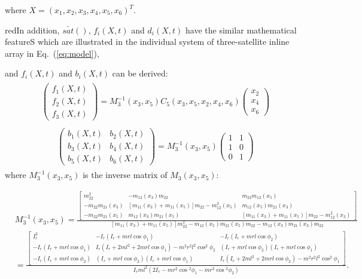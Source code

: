 where $X = (x_1,x_2,x_3,x_4,x_5,x_6)^T$. \begin{color}{red}In addition, $\bar{sat}()$, $f_i(X,t)$ and $d_i(X,t)$ have the similar mathematical featureS which are illustrated in the individual system of three-satellite inline array in Eq.~(\ref{eq:model}),\end{color} and $f_i(X,t)$ and $b_i(X,t)$ can be derived:
\begin{align}
\begin{split}
\begin{pmatrix}
f_1(X,t)\\
f_2(X,t)\\
f_3(X,t)
\end{pmatrix}=
M_3^{-1}(x_3,x_5)C_5(x_3,x_5,x_2,x_4,x_6)
\begin{pmatrix}
x_2\\
x_4\\
x_6
\end{pmatrix}
\end{split}
\end{align}
\begin{align}
\begin{split}
\begin{pmatrix}
b_1(X,t)&b_2(X,t)\\
b_3(X,t)&b_4(X,t)\\
b_5(X,t)&b_6(X,t)
\end{pmatrix}=
M_3^{-1}(x_3,x_5)
\begin{pmatrix}
1 &1\\
1 &0\\
0 &1
\end{pmatrix}
\end{split}
\end{align}
where $M_3^{-1}(x_3,x_5)$ is the inverse matrix of $M_3(x_3,x_5)$:
\begin{footnotesize}
\begin{align*}
&M_3^{-1}(x_3,x_5)
=\frac{\begin{bmatrix}
m_{22}^2 &-m_{12}(x_3)m_{22} &m_{22}m_{12}(x_5)\\
-m_{22}m_{21}(x_3) &[m_{11}(x_3)+m_{11}(x_5)]m_{22}-m_{12}^2(x_5) &m_{12}(x_5)m_{21}(x_3)\\
-m_{22}m_{21}(x_5) &m_{12}(x_3)m_{21}(x_5) &[m_{11}(x_3)+m_{11}(x_5)]m_{22}-m_{12}^2(x_3)
\end{bmatrix}}{[m_{11}(x_3)+m_{11}(x_5)]m_{22}^2-m_{12}(x_5)m_{21}(x_5)m_{22}-m_{12}(x_3)m_{21}(x_3)m_{22}}\\
&=\frac{\begin{bmatrix}
I_r^2 &-I_r(I_r+mrl\cos\phi_1) &-I_r(I_r+mrl\cos\phi_2)\\
-I_r(I_r+mrl\cos\phi_1) &I_r(I_r+2ml^2+2mrl\cos\phi_1)-m^2r^2l^2\cos^2\phi_2 &(I_r+mrl\cos\phi_2)(I_r+mrl\cos\phi_1)\\
-I_r(I_r+mrl\cos\phi_2) &(I_r+mrl\cos\phi_2)(I_r+mrl\cos\phi_1) &I_r(I_r+2ml^2+2mrl\cos\phi_2)-m^2r^2l^2\cos^2\phi_1
\end{bmatrix}}{I_rml^2(2I_r-mr^2\cos{^2\phi_1}-mr^2\cos{^2\phi_2})}.
\end{align*}
\end{footnotesize}\par
